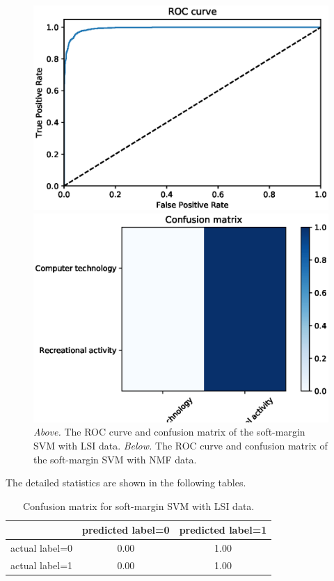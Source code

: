 \documentclass[letterpaper]{article}
\begin{document}
\begin{figure}[!htb]
\begin{minipage}{0.5\textwidth}
\includegraphics[width=1.0\textwidth]{roc-nmf-soft-svm}
\end{minipage}%
\begin{minipage}{0.5\textwidth}
\includegraphics[width=1.0\textwidth]{conf-mat-nmf-soft-svm}
\end{minipage}
\caption{\emph{Above.} The ROC curve and confusion matrix
of the soft-margin SVM with LSI data.
\emph{Below.} The ROC curve and confusion matrix of the soft-margin SVM
with NMF data.}
\label{fig:soft-svm-2}
\end{figure}

The detailed statistics are shown in the following tables.
\begin{table}[H]
\centering
\begin{tabular}{c|cc}
 & predicted label=0 & predicted label=1 \\ \hline
actual label=0 & 0.00 & 1.00 \\
actual label=1 & 0.00 & 1.00 \\
\end{tabular}
\caption{Confusion matrix for soft-margin SVM with LSI data.}
\end{table}
\end{document}
